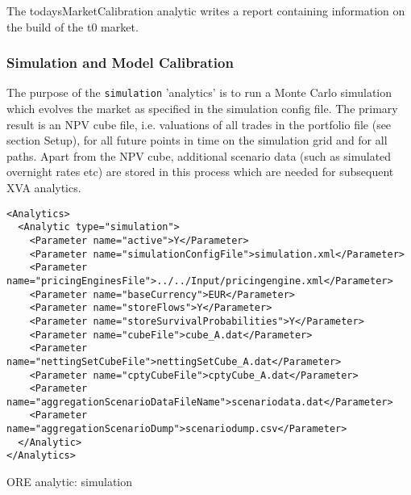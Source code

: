 {The todaysMarketCalibration analytic writes a report containing information on the build of the t0 market.

\subsubsection{Simulation and Model Calibration}

The purpose of the {\tt simulation} 'analytics' is to run a Monte Carlo simulation which evolves the market as
specified in the simulation config file. The primary result is an NPV cube file, i.e. valuations of all trades in the
portfolio file (see section Setup), for all future points in time on the simulation grid and for all paths. Apart from
the NPV cube, additional scenario data (such as simulated overnight rates etc) are stored in this process which are
needed for subsequent XVA analytics.

\begin{listing}[H]
\begin{verbatim}
<Analytics>
  <Analytic type="simulation">
    <Parameter name="active">Y</Parameter>
    <Parameter name="simulationConfigFile">simulation.xml</Parameter>
    <Parameter name="pricingEnginesFile">../../Input/pricingengine.xml</Parameter>
    <Parameter name="baseCurrency">EUR</Parameter>
    <Parameter name="storeFlows">Y</Parameter>
    <Parameter name="storeSurvivalProbabilities">Y</Parameter>
    <Parameter name="cubeFile">cube_A.dat</Parameter>
    <Parameter name="nettingSetCubeFile">nettingSetCube_A.dat</Parameter>
    <Parameter name="cptyCubeFile">cptyCube_A.dat</Parameter>
    <Parameter name="aggregationScenarioDataFileName">scenariodata.dat</Parameter>
    <Parameter name="aggregationScenarioDump">scenariodump.csv</Parameter>
  </Analytic>
</Analytics>      
\end{verbatim}
\caption{ORE analytic: simulation}
\label{lst:ore_simulation}
\end{listing}

}
